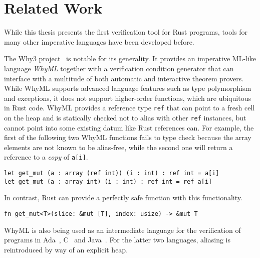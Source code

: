 \section{Related Work}
\label{sec:related}

While this thesis presents the first verification tool for Rust programs, tools
for many other imperative languages have been developed before.

The Why3 project~\cite{bobot2011why3} is notable for its generality. It provides
an imperative ML-like language \emph{WhyML} together with a verification
condition generator that can interface with a multitude of both automatic and
interactive theorem provers. While WhyML supports advanced language features such
as type polymorphism and exceptions, it does not support higher-order functions,
which are ubiquitous in Rust code.
WhyML provides a reference type \texttt{ref} that can point to a fresh cell on
the heap and is statically checked not to alias with other \texttt{ref}
instances, but cannot point into some existing datum like Rust references can.
For example, the first of the following two WhyML functions fails to type check
because the array elements are not known to be alias-free, while the second one
will return a reference to a \emph{copy} of \verb!a[i]!.

\begin{verbatim}
let get_mut (a : array (ref int)) (i : int) : ref int = a[i]
let get_mut (a : array int) (i : int) : ref int = ref a[i]
\end{verbatim}

In contrast, Rust can provide a perfectly safe function with this functionality.

\begin{verbatim}
fn get_mut<T>(slice: &mut [T], index: usize) -> &mut T
\end{verbatim}

WhyML is also being used as an intermediate language for the verification of
programs in Ada~\cite{guitton2011hi}, C~\cite{cuoq2012frama} and Java~\cite{filliatre2007krakatoa}.
For the latter two languages, aliasing is reintroduced by way of an explicit heap.

